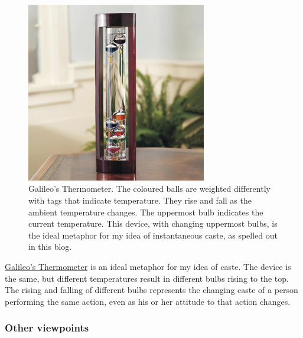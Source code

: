 \documentclass[
  a4paper,
]{article}
\begin{document}
\begin{figure}
\centering
\includegraphics[width=0.7\textwidth,height=\textheight]{images/galileo-thermometer.jpg}
\caption[Galileo's Thermometer. The coloured balls are weighted
differently with tags that indicate temperature. They rise and fall as
the ambient temperature changes. The uppermost bulb indicates the
current temperature. This device, with changing uppermost bulbs, is the
ideal metaphor for my idea of instantaneous caste, as spelled out in
this blog.]{Galileo's Thermometer. The coloured balls are weighted
differently with tags that indicate temperature. They rise and fall as
the ambient temperature changes. The uppermost bulb indicates the
current temperature. This device, with changing uppermost bulbs, is the
ideal metaphor for my idea of instantaneous caste, as spelled out in
this blog.\footnotemark{}}\label{fig:galileo}
\end{figure}

\href{https://en.wikipedia.org/wiki/Galileo_thermometer}{Galileo's
Thermometer} is an ideal metaphor for my idea of caste. The device is
the same, but different temperatures result in different bulbs rising to
the top. The rising and falling of different bulbs represents the
changing caste of a person performing the same action, even as his or
her attitude to that action changes.

\subsubsection{Other viewpoints}\label{other-viewpoints}
\end{document}
